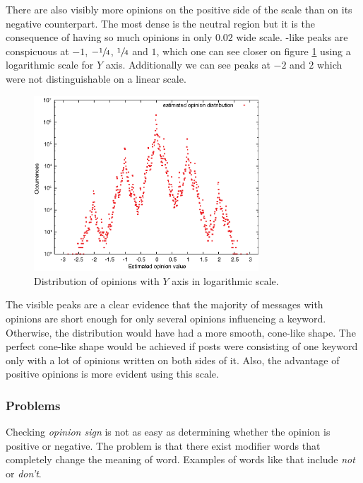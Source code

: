       There are also visibly more opinions on the positive side of the scale than on its negative counterpart. The most dense is the neutral region but it is the consequence of having so much opinions in only $0.02$ wide scale. -like peaks are conspicuous at $-1$, $-\sfrac{1}{4}$, $\sfrac{1}{4}$ and $1$, which one can see closer on figure \ref{fig:opinion_distribution_log} using a logarithmic scale for $Y$ axis. Additionally we can see peaks at $-2$ and $2$ which were not distinguishable on a linear scale.
      \begin{figure}[H]
        \centering
        \includegraphics[width=0.75\textwidth]{chapters/03_implementation/opidist_log}
        \caption{Distribution of opinions with $Y$ axis in logarithmic scale.}
        \label{fig:opinion_distribution_log}
      \end{figure}
      The visible peaks are a clear evidence that the majority of messages with opinions are short enough for only several opinions influencing a keyword. Otherwise, the distribution would have had a more smooth, cone-like shape. The perfect cone-like shape would be achieved if posts were consisting of one keyword only with a lot of opinions written on both sides of it. Also, the advantage of positive opinions is more evident using this scale.

    \subsubsection{Problems}

      Checking \emph{opinion sign} is not as easy as determining whether the opinion is positive or negative. The problem is that there exist modifier words that completely change the meaning of word. Examples of words like that include \emph{not} or \emph{don't}.
      
